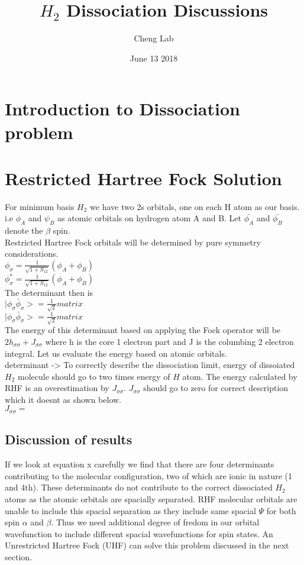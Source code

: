 \documentclass[11pt]{article}   	%
\begin{document}
\title{$H_2$ Dissociation Discussions}
\author{Cheng Lab}
\date{June 13 2018}							%
\maketitle
\section{Introduction to Dissociation problem}
\section{Restricted Hartree Fock Solution}
	For minimum basis $H_2$ we have two 2s orbitals, one on each H atom as our basis.
	i.e $\phi_A$ and $\psi_B$ as atomic orbitals on hydrogen atom A and B. Let $\bar{\phi_A}$ and $\bar{\phi_B}$
	denote the $\beta$ spin. \\
	Restricted Hartree Fock orbitals will be determined by pure symmetry considerations.\\ 
	$\phi_{\sigma}=\frac{1}{\sqrt{1+S_{12}}}(\phi_A+\phi_B)$\\	
	$\phi_{\sigma}^*=\frac{1}{\sqrt{1+S_{12}}}(\phi_A+\phi_B)$\\
	The determinant then is\\
	$|\phi_{\sigma}\bar{\phi}_{\sigma}>=\frac{1}{\sqrt{2}}matrix$\\
	$|\phi_{\sigma}\bar{\phi}_{\sigma}>=\frac{1}{\sqrt{2}}matrix$\\
	The energy of this determinant based on applying the Fock operator will be $2h_{\sigma \sigma} + J_{\sigma \sigma}$
	where h is the core 1 electron part and J is the columbing 2 electron integral. Let us evaluate the energy based on atomic orbitals.\\
	determinant ->
	To correctly describe the dissociation limit, energy of dissoiated $H_2$ molecule should go to two times energy of $H$ atom. The energy calculated by RHF is an overestimation by $J_{\sigma \sigma}$. 
	$J_{\sigma \sigma}$ should go to zero for correct description which it doesnt as shown below. \\
	$J_{\sigma \sigma}=$\\
	
	\subsection{Discussion of results}
	If we look at equation x carefully we find that there are four determinants contributing to the molecular configuration, two of which are ionic in nature (1 and 4th). 
	These determinants do not contribute to the correct dissociated $H_2$ atoms as the atomic orbitals are spacially separated. RHF molecular orbitals are unable to include this spacial separation as they 
	include same spacial $\Psi$ for both spin $\alpha$ and $\beta$. Thus we need additional degree of fredom in our orbital wavefunction to include different spacial wavefunctions for spin states. An Unrestricted 
	Hartree Fock (UHF) can solve this problem discussed in the next section. \\
\end{document}
